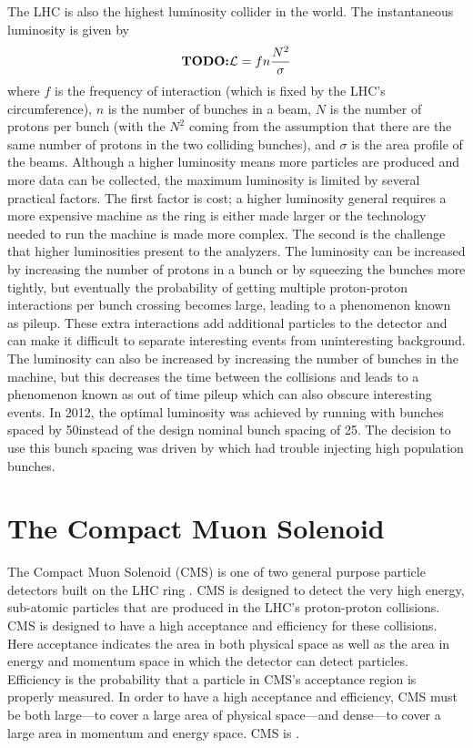 The LHC is also the highest luminosity collider in the world. The instantaneous
luminosity is given by
\begin{equation}
    \TODO{\luminosity=fn\frac{N^{2}}{\sigma}}
\end{equation}
where $f$ is the frequency of interaction (which is fixed by the LHC's
circumference), $n$ is the number of bunches in a beam, $N$ is the number of
protons per bunch (with the $N^{2}$ coming from the assumption that there are
the same number of protons in the two colliding bunches), and $\sigma$ is the
area profile of the beams. Although a higher luminosity means more particles
are produced and more data can be collected, the maximum luminosity is limited
by several practical factors. The first factor is cost; a higher luminosity
general requires a more expensive machine as the ring is either made larger or
the technology needed to run the machine is made more complex. The second is
the challenge that higher luminosities present to the analyzers. The luminosity
can be increased by increasing the number of protons in a bunch or by squeezing
the bunches more tightly, but eventually the probability of getting multiple
proton-proton interactions per bunch crossing becomes large, leading to a
phenomenon known as pileup. These extra interactions add additional particles
to the detector and can make it difficult to separate interesting events from
uninteresting background. The luminosity can also be increased by increasing
the number of bunches in the machine, but this decreases the time between the
collisions and leads to a phenomenon known as out of time pileup which can also
obscure interesting events. In 2012, the optimal luminosity was achieved by
running with bunches spaced by 50\ns instead of the design nominal bunch
spacing of 25\ns. The decision to use this bunch spacing was driven by
\linactwo which had trouble injecting high population bunches.

\section{The Compact Muon Solenoid}
\label{cms_section}


The Compact Muon Solenoid (CMS) is one of two general purpose particle
detectors built on the LHC ring \cite{cms_tdr_1}\cite{cms_tdr_2}. CMS is
designed to detect the very high energy, sub-atomic particles that are produced
in the LHC's proton-proton collisions. CMS is designed to have a high
acceptance and efficiency for these collisions. Here acceptance indicates the
area in both physical space as well as the area in energy and momentum space in
which the detector can detect particles. Efficiency is the probability that a
particle in CMS's acceptance region is properly measured. In order to have a
high acceptance and efficiency, CMS must be both large---to cover a large area
of physical space---and dense---to cover a large area in momentum and energy
space. CMS is .


